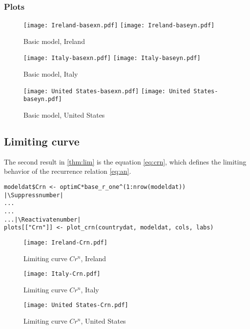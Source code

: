 \subsubsection{Plots}

\begin{figure}[H]
  \texttt{[image: Ireland-basexn.pdf]} \label{fig:ireland-basexn}
\endminipage\hfill
{}
  \texttt{[image: Ireland-baseyn.pdf]} \label{fig:ireland-baseyn}
\endminipage
\caption{Basic model, Ireland}
\end{figure}

\begin{figure}[H]
  \texttt{[image: Italy-basexn.pdf]} \label{fig:italy-basexn}
\endminipage\hfill
{}
  \texttt{[image: Italy-baseyn.pdf]} \label{fig:italy-baseyn}
\endminipage
\caption{Basic model, Italy}
\end{figure}

\begin{figure}[H]
  \texttt{[image: United States-basexn.pdf]} \label{fig:usa-basexn}
\endminipage\hfill
{}
  \texttt{[image: United States-baseyn.pdf]} \label{fig:usa-baseyn}
\endminipage
\caption{Basic model, United States}
\end{figure}

\subsection{Limiting curve}

The second result in \ref{thm:lim} is the equation \ref{eq:crn}, which defines the limiting behavior of the recurrence relation \ref{eq:an}.

\begin{lstlisting}[breaklines = true, escapeinside=||, tabsize = 4, caption = {Algorithm for Limiting Curve}]
modeldat$Crn <- optimC*base_r_one^(1:nrow(modeldat))  |\Suppressnumber|
...
...
...|\Reactivatenumber|
plots[["Crn"]] <- plot_crn(countrydat, modeldat, cols, labs)
\end{lstlisting}

\begin{figure}[H]
\texttt{[image: Ireland-Crn.pdf]}
\caption{Limiting curve $Cr^n$, Ireland}
\endminipage 
{}
\texttt{[image: Italy-Crn.pdf]}
\caption{Limiting curve $Cr^n$, Italy}
\endminipage 
{}
\texttt{[image: United States-Crn.pdf]}
\caption{Limiting curve $Cr^n$, United States}
\endminipage 
\end{figure}

